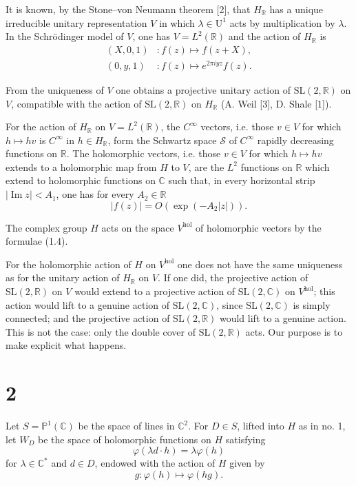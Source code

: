 \documentclass[12pt,a4paper]{article}
\theoremstyle{plain}
\theoremstyle{definition}
\theoremstyle{remark}
\DeclareMathOperator{\Impart}{Im}
\begin{document}
It is known, by the Stone--von Neumann theorem [2], that $H_{\mathbb R}$ has a unique irreducible unitary representation $V$ in which $\lambda\in \mathrm U^1$ acts by multiplication by $\lambda$. In the Schrödinger model of $V$, one has $V=L^2(\mathbb R)$ and the action of $H_{\mathbb R}$ is
\begin{align*}
(X,0,1)&\colon f(z)\mapsto f(z+X),\\
(0,y,1)&\colon f(z)\mapsto e^{2\pi iyz}f(z).\tag{1.4}
\end{align*}

From the uniqueness of $V$ one obtains a projective unitary action of $\mathrm{SL}(2,\mathbb R)$ on $V$, compatible with the action of $\mathrm{SL}(2,\mathbb R)$ on $H_{\mathbb R}$ (A. Weil [3], D. Shale [1]).

For the action of $H_{\mathbb R}$ on $V=L^2(\mathbb R)$, the $C^\infty$ vectors, i.e. those $v\in V$ for which $h\mapsto hv$ is $C^\infty$ in $h\in H_{\mathbb R}$, form the Schwartz space $\mathcal S$ of $C^\infty$ rapidly decreasing functions on $\mathbb R$. The holomorphic vectors, i.e. those $v\in V$ for which $h\mapsto hv$ extends to a holomorphic map from $H$ to $V$, are the $L^2$ functions on $\mathbb R$ which extend to holomorphic functions on $\mathbb C$ such that, in every horizontal strip $|\Impart z|<A_1$, one has for every $A_2\in \mathbb R$
\[
|f(z)| = O(\exp(-A_2|z|)).
\]

The complex group $H$ acts on the space $V^{\mathrm{hol}}$ of holomorphic vectors by the formulae (1.4).

For the holomorphic action of $H$ on $V^{\mathrm{hol}}$ one does not have the same uniqueness as for the unitary action of $H_{\mathbb R}$ on $V$. If one did, the projective action of $\mathrm{SL}(2,\mathbb R)$ on $V$ would extend to a projective action of $\mathrm{SL}(2,\mathbb C)$ on $V^{\mathrm{hol}}$; this action would lift to a genuine action of $\mathrm{SL}(2,\mathbb C)$, since $\mathrm{SL}(2,\mathbb C)$ is simply connected; and the projective action of $\mathrm{SL}(2,\mathbb R)$ would lift to a genuine action. This is not the case: only the double cover of $\mathrm{SL}(2,\mathbb R)$ acts. Our purpose is to make explicit what happens.

\section*{2}

Let $S=\mathbb P^1(\mathbb C)$ be the space of lines in $\mathbb C^2$. For $D\in S$, lifted into $H$ as in no. 1, let $W_D$ be the space of holomorphic functions on $H$ satisfying
\[
\varphi(\lambda d\cdot h)=\lambda\varphi(h)
\]
for $\lambda\in \mathbb C^*$ and $d\in D$, endowed with the action of $H$ given by
\[
g\colon \varphi(h)\mapsto \varphi(hg).
\]
\end{document}
